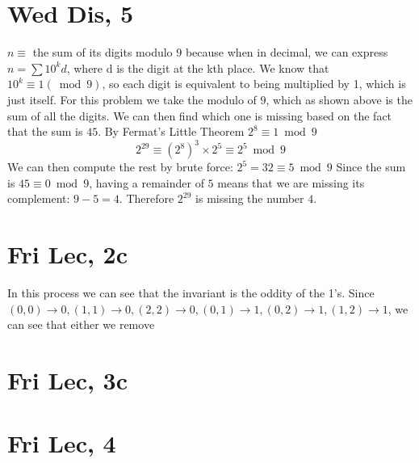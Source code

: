 \documentclass[12pt]{article}
\begin{document}
\section{Wed Dis, 5}
$n \equiv$ the sum of its digits modulo 9 because when in decimal, we can express $n = \sum 10^kd$, where d is the digit at the kth place. We know that $10^k \equiv 1(\bmod 9)$, so each digit is equivalent to being multiplied by 1, which is just itself.
\newline
For this problem we take the modulo of $9$, which as shown above is the sum of all the digits. We can then find which one is missing based on the fact that the sum is $45$.
\newline
By Fermat's Little Theorem $2^8 \equiv 1 \bmod 9$
$$2^29 \equiv (2^{8})^3 \times 2^5 \equiv 2^5 \bmod 9$$
We can then compute the rest by brute force: $2^5 = 32 \equiv 5 \bmod 9$
\newline
Since the sum is $45 \equiv 0 \bmod 9$, having a remainder of $5$ means that we are missing its complement: $9-5=4$.
\newline
Therefore $2^29$ is missing the number $4$.
\newpage


\section{Fri Lec, 2c}
In this process we can see that the invariant is the oddity of the 1's. Since $(0,0)
\to 0, (1,1)\to 0, (2,2)\to 0, (0,1) \to 1, (0,2)\to 1, (1,2)\to 1$, we can see that either we remove
\section{Fri Lec, 3c}

\section{Fri Lec, 4}
\end{document}
